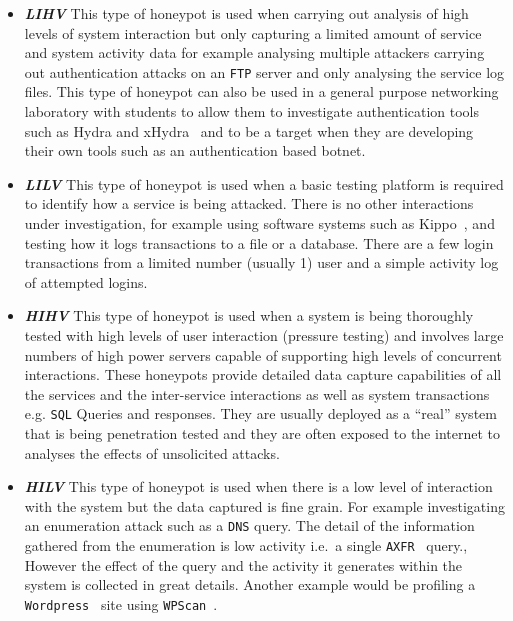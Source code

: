 \begin{itemize}
  \item \noindent \emph{\textbf{LIHV}} This type of honeypot is used when
    carrying out analysis of high levels of system interaction but only
    capturing a limited amount of service and system activity data for example
    analysing multiple attackers carrying out authentication attacks on an
    \texttt{FTP} server and only analysing the service log files. This type of
    honeypot can also be used in a general purpose networking laboratory with
    students to allow them to investigate authentication tools such as Hydra
    and xHydra~\cite{RS:15} and to be a target when they are developing their
    own tools such as an authentication based botnet.
  \item \noindent \emph{\textbf{LILV}} This type of honeypot is used when a
    basic testing platform is required to identify how a service is being
    attacked. There is no other interactions under investigation, for example
    using software systems such as Kippo~\cite{D:16,SH:15}, and testing how it
    logs transactions to a file or a database. There are a few login
    transactions from a limited number (usually 1) user and a simple activity
    log of attempted logins.
  \item \noindent \emph{\textbf{HIHV}} This type of honeypot is used when a
    system is being thoroughly tested with high levels of user interaction
    (pressure testing) and involves large numbers of high power servers capable
    of supporting high levels of concurrent interactions. These honeypots
    provide detailed data capture capabilities of all the services and the
    inter-service interactions as well as system transactions e.g. \texttt{SQL}
    Queries and responses. They are usually deployed as a ``real'' system that
    is being penetration tested and they are often exposed to the internet to
    analyses the effects of unsolicited attacks.
  \item \noindent \emph{\textbf{HILV}} This type of honeypot is used when there
    is a low level of interaction with the system but the data captured is fine
    grain. For example investigating an enumeration attack such as a
    \texttt{DNS} query. The detail of the information gathered from the
    enumeration is low activity i.e.\ a single \texttt{AXFR}~\cite{EL:10}
    query., However the effect of the query and the activity it generates
    within the system is collected in great details. Another example would be
    profiling a \texttt{Wordpress}~\cite{WP:17} site using
    \texttt{WPScan}~\cite{WT:17}.
\end{itemize}

